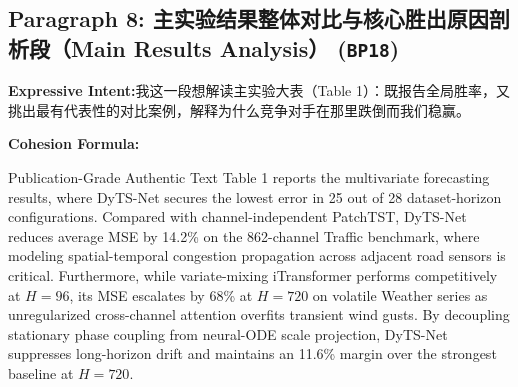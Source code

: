 \subsection*{Paragraph 8: 主实验结果整体对比与核心胜出原因剖析段（Main Results Analysis） (\texttt{BP18})}
\noindent\textbf{Expressive Intent:}\enspace 我这一段想解读主实验大表（Table 1）：既报告全局胜率，又挑出最有代表性的对比案例，解释为什么竞争对手在那里跌倒而我们稳赢。\par
\noindent\textbf{Cohesion Formula:}\par\vspace{4pt}
\begin{ExampleBox}{Publication-Grade Authentic Text}
Table 1 reports the multivariate forecasting results, where DyTS-Net secures the lowest error in 25 out of 28 dataset-horizon configurations. Compared with channel-independent PatchTST, DyTS-Net reduces average MSE by 14.2\% on the 862-channel Traffic benchmark, where modeling spatial-temporal congestion propagation across adjacent road sensors is critical. Furthermore, while variate-mixing iTransformer performs competitively at $H=96$, its MSE escalates by 68\% at $H=720$ on volatile Weather series as unregularized cross-channel attention overfits transient wind gusts. By decoupling stationary phase coupling from neural-ODE scale projection, DyTS-Net suppresses long-horizon drift and maintains an 11.6\% margin over the strongest baseline at $H=720$.
\end{ExampleBox}
